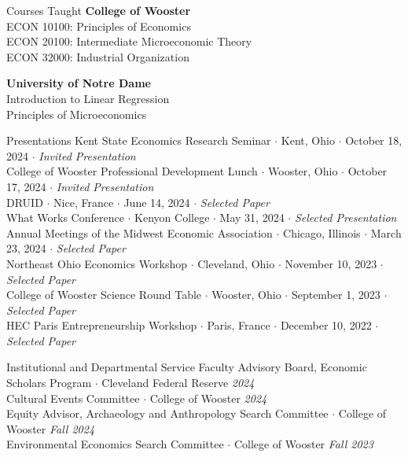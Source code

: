 \documentclass{resume} %
\begin{document}

\begin{rSection}{Courses Taught}
	{\bf College of Wooster}  \\ 
	ECON 10100: Principles of Economics \\
	ECON 20100: Intermediate Microeconomic Theory \\
	ECON 32000: Industrial Organization

	{\bf University of Notre Dame}  \\ 
	Introduction to Linear Regression \\
    Principles of Microeconomics
\end{rSection}

\newpage
\begin{rSection}{Presentations}
Kent State Economics Research Seminar $\cdot$ Kent, Ohio $\cdot$ October 18, 2024 $\cdot$ \textit{Invited Presentation} \\
College of Wooster Professional Development Lunch $\cdot$ Wooster, Ohio $\cdot$ October 17, 2024 $\cdot$ \textit{Invited Presentation} \\
DRUID $\cdot$ Nice, France $\cdot$ June 14, 2024 $\cdot$ \textit{Selected Paper} \\
What Works Conference $\cdot$ Kenyon College $\cdot$ May 31, 2024 $\cdot$ \textit{Selected Presentation} \\
Annual Meetings of the Midwest Economic Association $\cdot$ Chicago, Illinois $\cdot$ March 23, 2024 $\cdot$ \textit{Selected Paper} \\
Northeast Ohio Economics Workshop $\cdot$ Cleveland, Ohio $\cdot$ November 10, 2023 $\cdot$ \textit{Selected Paper} \\
College of Wooster Science Round Table $\cdot$ Wooster, Ohio $\cdot$ September 1, 2023 $\cdot$ \textit{Selected Paper} \\
HEC Paris Entrepreneurship Workshop $\cdot$ Paris, France $\cdot$ December 10, 2022 $\cdot$ \textit{Selected Paper} 
\end{rSection}

\begin{rSection}{Institutional and Departmental Service}
	Faculty Advisory Board, Economic Scholars Program $\cdot$ Cleveland Federal Reserve \hfill {\em 2024} \\
	Cultural Events Committee $\cdot$ College of Wooster \hfill {\em 2024} \\
	Equity Advisor, Archaeology and Anthropology Search Committee $\cdot$ College of Wooster \hfill {\em Fall 2024} \\
	Environmental Economics Search Committee $\cdot$ College of Wooster \hfill {\em Fall 2023}
\end{rSection}
\end{document}
